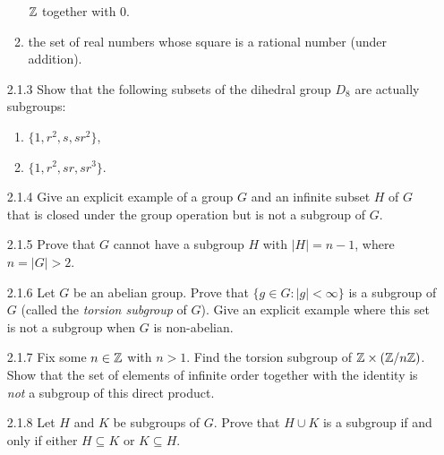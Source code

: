 \begin{enumerate}
\begin{enumerate}
                           $\mathbb{Z}$ together with 0.
                     \item the set of real numbers whose square is a rational
                           number (under addition).
                  \end{enumerate}
   \item[2.1.3]   Show that the following subsets of the dihedral group $D_8$
                  are actually subgroups:
                  \begin{enumerate}
                     \item $\{1, r^2, s, sr^2\}$,
                     \item $\{1, r^2, sr, sr^3\}$.
                  \end{enumerate}
   \item[2.1.4]   Give an explicit example of a group $G$ and an infinite subset
                  $H$ of $G$ that is closed under the group operation but is not
                  a subgroup of $G$.
   \item[2.1.5]   Prove that $G$ cannot have a subgroup $H$ with $|H| = n - 1$,
                  where $n = |G| > 2$.
   \item[2.1.6]   Let $G$ be an abelian group. Prove that
                  $\{g \in G : |g| < \infty\}$ is a subgroup of $G$ (called the
                  \textit{torsion subgroup} of $G$). Give an explicit example
                  where this set is not a subgroup when $G$ is non-abelian.
   \item[2.1.7]   Fix some $n \in \mathbb{Z}$ with $n > 1$. Find the torsion subgroup
                  of $\mathbb{Z} \times (\mathbb{Z}/n\mathbb{Z})$. Show that the set of elements of
                  infinite order together with the identity is \textit{not} a
                  subgroup of this direct product.
   \item[2.1.8]   Let $H$ and $K$ be subgroups of $G$. Prove that $H \cup K$ is
                  a subgroup if and only if either $H \subseteq K$ or
                  $K \subseteq H$.

\end{enumerate}
